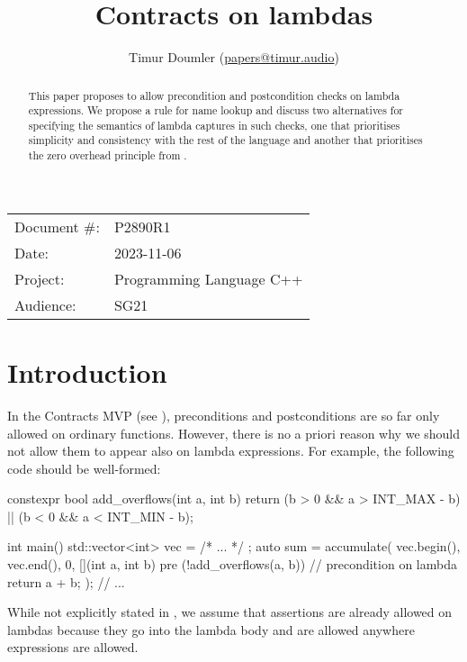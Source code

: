 


\title{Contracts on lambdas}
\author{ Timur Doumler \small(\href{mailto:papers@timur.audio}{papers@timur.audio})}
\date{}
\maketitle

\begin{tabular}{ll}
Document \#: & P2890R1 \\
Date: &2023-11-06 \\
Project: & Programming Language C++ \\
Audience: & SG21
\end{tabular}

\begin{abstract}
This paper proposes to allow precondition and postcondition checks on lambda expressions. We propose a rule for name lookup and discuss two alternatives for specifying the semantics of lambda captures in such checks, one that prioritises simplicity and consistency with the rest of the language and another that prioritises the zero overhead principle from \cite{P2932R1}.
\end{abstract}

\section{Introduction}
\label{sec:intro}

In the Contracts MVP (see \cite{P2900R1}), preconditions and postconditions are so far only allowed on ordinary functions. However, there is no a priori reason why we should not allow them to appear also on lambda expressions. For example, the following code should be well-formed:
\begin{codeblock}
constexpr bool add_overflows(int a, int b) {
  return (b > 0 && a > INT_MAX - b) || (b < 0 && a < INT_MIN - b);
}

int main() {
  std::vector<int> vec = { /* ... */ };
  auto sum = accumulate(
    vec.begin(), vec.end(), 0, 
    [](int a, int b) 
      pre (!add_overflows(a, b))  // precondition on lambda
    {
      return a + b;
    });
  // ...
}
\end{codeblock}

While not explicitly stated in \cite{P2900R1}, we assume that assertions are already allowed on lambdas because they go into the lambda body and are allowed anywhere expressions are allowed.

